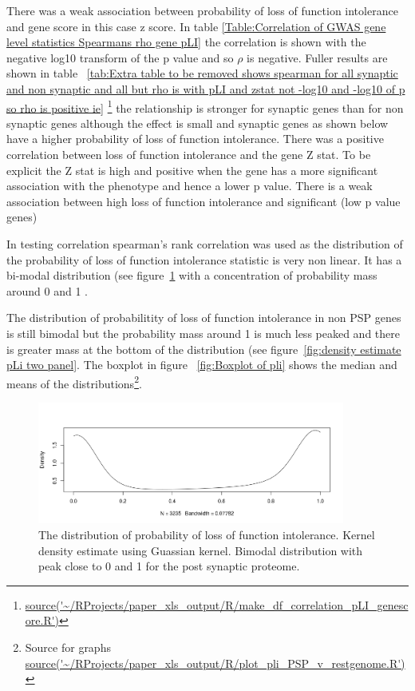 There was a weak association between probability of loss of function intolerance and gene score in this case z score. In table \ref{Table:Correlation of GWAS gene level statistics Spearmans rho gene pLI} the correlation is shown with the negative log10 transform of the p value and so $\rho$ is negative. Fuller results are shown in table ~\ref{tab:Extra table to be removed shows spearman for all synaptic and non synaptic and all but rho is with pLI and zstat not -log10 and -log10 of p  so rho is positive ie}  \footnote{\url{source('~/RProjects/paper_xls_output/R/make_df_correlation_pLI_genescore.R')}} the relationship is stronger for synaptic genes than for non synaptic genes although the effect is small and synaptic genes as shown below have a higher probability of loss of function intolerance.
There was a positive correlation between loss of function intolerance and the gene Z stat. To be explicit the Z stat is high and positive when the gene has a more significant association with the phenotype and hence a lower p value. There is a weak association between high loss of function intolerance and significant (low p value genes)

 In testing correlation spearman’s rank correlation was used as the distribution of the probability of loss of function intolerance statistic is very non linear. It has a bi-modal distribution (see figure~\ref{fig:density estimate pLi} with a concentration of probability mass around 0 and 1 .


The distribution of probabilitity of loss of function intolerance in non PSP genes is still bimodal but the probability mass around 1 is much less peaked and there is greater mass at the bottom of the distribution (see figure~\ref{fig:density estimate pLi two panel}. The boxplot in figure ~\ref{fig:Boxplot of pli} shows the median and means of the distributions\footnote{ Source for graphs \url{source('~/RProjects/paper_xls_output/R/plot_pli_PSP_v_restgenome.R')}}. 


\begin{figure}
    \centering
    \includegraphics[width=0.9\textwidth]{images/Rplot_kernel_density.png}
    \caption{The distribution of probability of loss of function intolerance. Kernel density estimate using Guassian kernel. Bimodal distribution with peak close to 0 and 1 for the post synaptic proteome. }
    \label{fig:density estimate pLi}
\end{figure}

